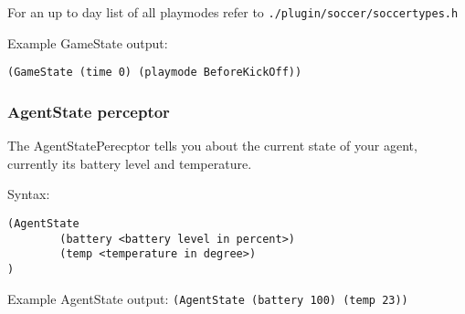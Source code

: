 For an up to day list of all playmodes refer to
\texttt{./plugin/soccer/soccertypes.h}


Example GameState output:

\texttt{(GameState (time 0) (playmode BeforeKickOff))}

\subsubsection{AgentState perceptor}

The AgentStatePerecptor tells you about the current state of your
agent, currently its battery level and temperature.

Syntax:
\begin{verbatim}
(AgentState
        (battery <battery level in percent>)
        (temp <temperature in degree>)
)
\end{verbatim}

Example AgentState output:
\texttt{(AgentState (battery 100) (temp 23))}






